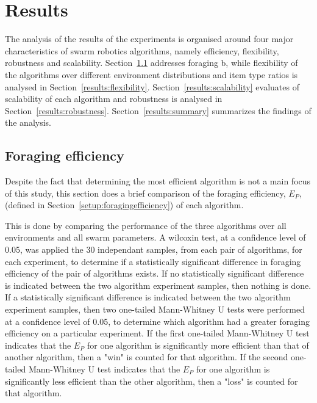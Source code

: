 \chapter{Results}
\label{chap:results}

The analysis of the results of the experiments is organised around four major characteristics of swarm robotics algorithms, namely efficiency, flexibility, robustness and scalability. Section~\ref{results:efficiency} addresses foraging b, while flexibility of the algorithms over different environment distributions and item type ratios is analysed in Section~\ref{results:flexibility}. Section~\ref{results:scalability} evaluates of scalability of each algorithm and robustness is analysed in Section~\ref{results:robustness}. Section~\ref{results:summary} summarizes the findings of the analysis.

\section{Foraging efficiency}
\label{results:efficiency}


Despite the fact that determining the most efficient algorithm is not a main focus of this study, this section does a brief comparison of the foraging efficiency, $E_P$, (defined in Section~\ref{setup:foragingefficiency}) of each algorithm. 

This is done by comparing the performance of the three algorithms over all environments and all swarm parameters. A wilcoxin test, at a confidence level of 0.05, was applied the 30 independant samples, from each pair of algorithms, for each experiment, to determine if a statistically significant difference in foraging efficiency of the pair of algorithms exists. If no statistically significant difference is indicated between the two algorithm experiment samples, then nothing is done. If a statistically significant difference is indicated between the two algorithm experiment samples, then two one-tailed Mann-Whitney U tests were performed at a confidence level of 0.05, to determine which algorithm had a greater foraging efficiency on a particular experiment. If the first one-tailed Mann-Whitney U test indicates that the $E_P$ for one algorithm is significantly more efficient than that of another algorithm, then a "win" is counted for that algorithm. If the second one-tailed Mann-Whitney U test indicates that the $E_P$ for one algorithm is significantly less efficient than the other algorithm, then a "loss" is counted for that algorithm. %

